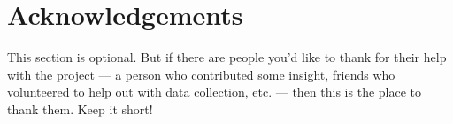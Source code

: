 
\section{Acknowledgements} 
\label{sec:ack} 

This section is optional. But if there are people you'd like to thank for their help with the project --- a person who contributed some insight, friends who volunteered to help out with data collection, etc. --- then this is the place to thank them. Keep it short!
